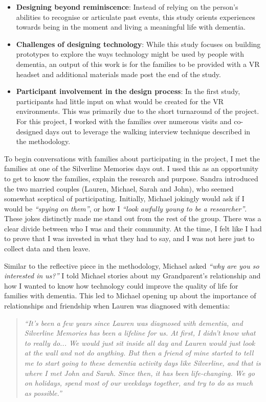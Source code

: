 \begin{itemize}
    \item \textbf{Designing beyond reminiscence}: Instead of relying on the person's abilities to recognise or articulate past events, this study orients experiences towards being in the moment and living a meaningful life with dementia.

    \item \textbf{Challenges of designing technology}: While this study focuses on building prototypes to explore the ways technology might be used by people with dementia, an output of this work is for the families to be provided with a VR headset and additional materials made post the end of the study.

    \item \textbf{Participant involvement in the design process}: In the first study, participants had little input on what would be created for the VR environments. This was primarily due to the short turnaround of the project. For this project, I worked with the families over numerous visits and co-designed days out to leverage the walking interview technique described in the methodology.
\end{itemize}

To begin conversations with families about participating in the project, I met the families at one of the Silverline Memories days out. I used this as an opportunity to get to know the families, explain the research and purpose. Sandra introduced the two married couples (Lauren, Michael, Sarah and John), who seemed somewhat sceptical of participating. Initially, Michael jokingly would ask if I would be \textit{``spying on them''}, or how I \textit{``look awfully young to be a researcher''}. These jokes distinctly made me stand out from the rest of the group. There was a clear divide between who I was and their community. At the time, I felt like I had to prove that I was invested in what they had to say, and I was not here just to collect data and then leave. 

Similar to the reflective piece in the methodology, Michael asked \textit{``why are you so interested in us?''} I told Michael stories about my Grandparent's relationship and how I wanted to know how technology could improve the quality of life for families with dementia. This led to Michael  opening up about the importance of relationships and friendship when Lauren was diagnosed with dementia:

\begin{quote}
\textit{``It's been a few years since Lauren was diagnosed with dementia, and Silverline Memories has been a lifeline for us. At first, I didn't know what to really do... We would just sit inside all day and Lauren would just look at the wall and not do anything. But then a friend of mine started to tell me to start going to these dementia activity days like Silverline, and that is where I met John and Sarah. Since then, it has been life-changing. We go on holidays, spend most of our weekdays together, and try to do as much as possible.''
}    
\end{quote}

